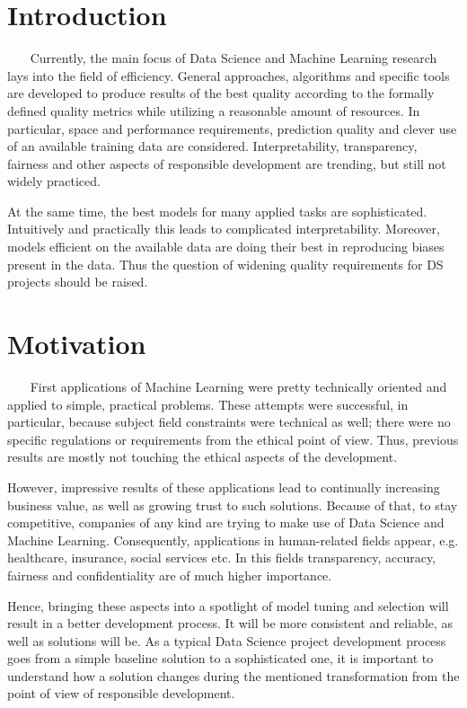 \section{Introduction}~~~ 
    Currently, the main focus of Data Science and Machine Learning research lays into the field of efficiency. General approaches, algorithms and specific tools are developed to produce results of the best quality according to the formally defined quality metrics while utilizing a reasonable amount of resources. In particular, space and performance requirements, prediction quality and clever use of an available training data are considered. Interpretability, transparency, fairness and other aspects of responsible development are trending, but still not widely practiced.

    At the same time, the best models for many applied tasks are sophisticated. Intuitively and practically this leads to complicated interpretability. Moreover, models efficient on the available data are doing their best in reproducing biases present in the data. Thus the question of widening quality requirements for DS projects should be raised.

\section{Motivation}~~~
    First applications of Machine Learning were pretty technically oriented and applied to simple, practical problems. These attempts were successful, in particular, because subject field constraints were technical as well; there were no specific regulations or requirements from the ethical point of view. Thus, previous results are mostly not touching the ethical aspects of the development.
    
    However, impressive results of these applications lead to continually increasing business value, as well as growing trust to such solutions. Because of that, to stay competitive, companies of any kind are trying to make use of Data Science and Machine Learning. Consequently, applications in human-related fields appear, e.g. healthcare, insurance, social services etc. In this fields transparency, accuracy, fairness and confidentiality are of much higher importance.
    
    Hence, bringing these aspects into a spotlight of model tuning and selection will result in a better development process. It will be more consistent and reliable, as well as solutions will be. As a typical Data Science project development process goes from a simple baseline solution to a sophisticated one, it is important to understand how a solution changes during the mentioned transformation from the point of view of responsible development.
    
